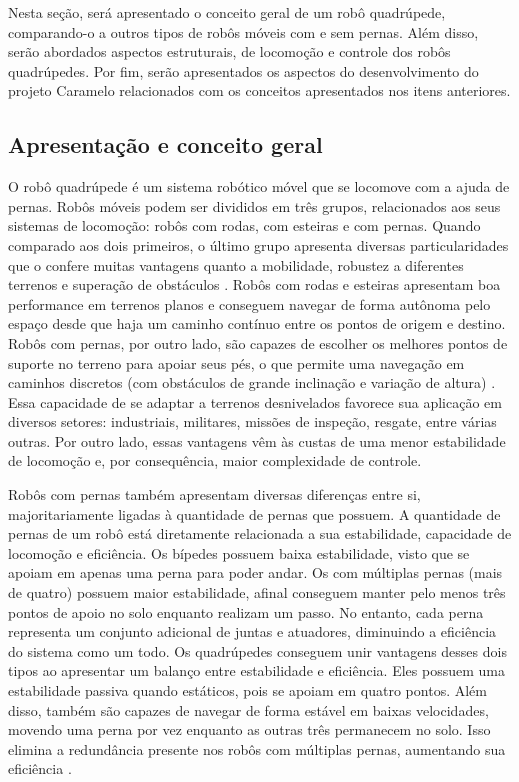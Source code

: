\documentclass[../main.tex]{subfiles}
\begin{document}
Nesta seção, será apresentado o conceito geral de um robô quadrúpede, comparando-o a outros tipos de robôs móveis com e sem pernas. Além disso, serão abordados aspectos estruturais, de locomoção e controle dos robôs quadrúpedes. Por fim, serão apresentados os aspectos do desenvolvimento do projeto Caramelo relacionados com os conceitos apresentados nos itens anteriores.

\subsection{Apresentação e conceito geral}
O robô quadrúpede é um sistema robótico móvel que se locomove com a ajuda de pernas. Robôs móveis podem ser divididos em três grupos, relacionados aos seus sistemas de locomoção: robôs com rodas, com esteiras e com pernas. Quando comparado aos dois primeiros, o último grupo apresenta diversas particularidades que o confere muitas vantagens quanto a mobilidade, robustez a diferentes terrenos e superação de obstáculos \cite{Biswal2021}. Robôs com rodas e esteiras apresentam boa performance em terrenos planos e conseguem navegar de forma autônoma pelo espaço desde que haja um caminho contínuo entre os pontos de origem e destino. Robôs com pernas, por outro lado, são capazes de escolher os melhores pontos de suporte no terreno para apoiar seus pés, o que permite uma navegação em caminhos discretos (com obstáculos de grande inclinação e variação de altura) \cite{Yao2021}. Essa capacidade de se adaptar a terrenos desnivelados favorece sua aplicação em diversos setores: industriais, militares, missões de inspeção, resgate, entre várias outras. Por outro lado, essas vantagens vêm às custas de uma menor estabilidade de locomoção e, por consequência, maior complexidade de controle.

Robôs com pernas também apresentam diversas diferenças entre si, majoritariamente ligadas à quantidade de pernas que possuem. A quantidade de pernas de um robô está diretamente relacionada a sua estabilidade, capacidade de locomoção e eficiência. Os bípedes possuem baixa estabilidade, visto que se apoiam em apenas uma perna para poder andar. Os com múltiplas pernas (mais de quatro) possuem maior estabilidade, afinal conseguem manter pelo menos três pontos de apoio no solo enquanto realizam um passo. No entanto, cada perna representa um conjunto adicional de juntas e atuadores, diminuindo a eficiência do sistema como um todo. Os quadrúpedes conseguem unir vantagens desses dois tipos ao apresentar um balanço entre estabilidade e eficiência. Eles possuem uma estabilidade passiva quando estáticos, pois se apoiam em quatro pontos. Além disso, também são capazes de navegar de forma estável em baixas velocidades, movendo uma perna por vez enquanto as outras três permanecem no solo. Isso elimina a redundância presente nos robôs com múltiplas pernas, aumentando sua eficiência \cite{Yao2021}.
\end{document}
